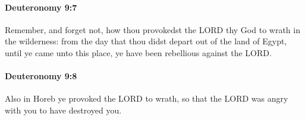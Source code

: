 		\paragraph{Deuteronomy 9:7} %
			\label{DEUTERONOMY-9-7}

			Remember, and forget not, how thou provokedst the LORD thy God to wrath in the wilderness: from the day that thou didst depart out of the land of Egypt, until ye came unto this place, ye have been rebellious against the LORD.


		\paragraph{Deuteronomy 9:8} %
			\label{DEUTERONOMY-9-8}

			Also in Horeb ye provoked the LORD to wrath, so that the LORD was angry with you to have destroyed you.


